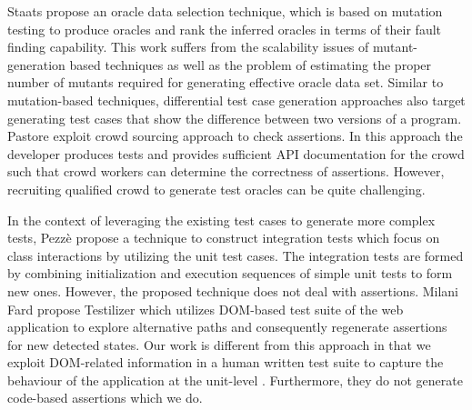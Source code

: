 Staats \etal \cite{staats:icse12} propose an oracle data selection technique, which is based on mutation testing to produce oracles and rank the inferred oracles in terms of their fault finding capability. This work suffers from the scalability issues of mutant-generation based techniques as well as the problem of estimating the proper number of mutants required for generating effective oracle data set.
Similar to mutation-based techniques, differential test case generation approaches \cite{taneja:ase08, elbaum:tse09} also target generating test cases that show the difference between two versions of a program. %
Pastore \etal \cite{pastore:icst13} exploit crowd sourcing approach to check assertions. In this approach the developer produces tests and provides sufficient API documentation for the crowd such that crowd workers can determine the correctness of assertions. However, recruiting qualified crowd to generate test oracles can be quite challenging.

In the context of leveraging the existing test cases to generate more complex tests, Pezz\`e \etal \cite{pezze:icst13} propose a technique to construct integration tests which focus on class interactions by utilizing the unit test cases. 
The integration tests are formed by combining initialization and execution sequences of simple unit tests to form new ones. However, the proposed technique does not deal with assertions.  
Milani Fard \etal \cite{milanifard:ase14} propose Testilizer which utilizes DOM-based test suite of the web application to explore alternative paths and consequently regenerate assertions for new detected states. Our work is different from this approach in that we exploit DOM-related information in a human written test suite to capture the behaviour of the application at the unit-level \javascript. Furthermore, they do not generate code-based assertions which we do.
  



